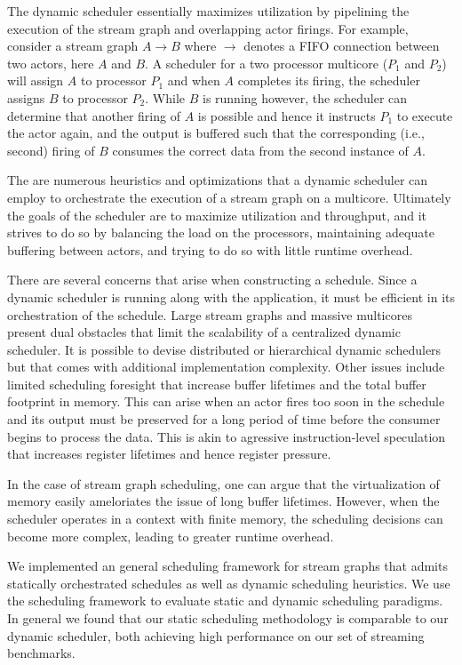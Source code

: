The dynamic scheduler essentially maximizes utilization by pipelining
the execution of the stream graph and overlapping actor firings. For
example, consider a stream graph $A\rightarrow B$ where $\rightarrow$
denotes a FIFO connection between two actors, here $A$ and $B$. A
scheduler for a two processor multicore ($P_1$ and $P_2$) will assign
$A$ to processor $P_1$ and when $A$ completes its firing, the
scheduler assigns $B$ to processor $P_2$. While $B$ is running
however, the scheduler can determine that another firing of $A$ is
possible and hence it instructs $P_1$ to execute the actor again, and
the output is buffered such that the corresponding (i.e., second)
firing of $B$ consumes the correct data from the second instance of
$A$.


The are numerous heuristics and optimizations that a dynamic scheduler
can employ to orchestrate the execution of a stream graph on a
multicore. Ultimately the goals of the scheduler are to maximize
utilization and throughput, and it strives to do so by balancing the
load on the processors, maintaining adequate buffering between actors,
and trying to do so with little runtime overhead.

There are several concerns that arise when constructing a
schedule. Since a dynamic scheduler is running along with the
application, it must be efficient in its orchestration of the
schedule. Large stream graphs and massive multicores present dual
obstacles that limit the scalability of a centralized dynamic
scheduler. It is possible to devise distributed or hierarchical
dynamic schedulers but that comes with additional implementation
complexity. Other issues include limited scheduling foresight that
increase buffer lifetimes and the total buffer footprint in
memory. This can arise when an actor fires too soon in the schedule
and its output must be preserved for a long period of time before the
consumer begins to process the data. This is akin to agressive
instruction-level speculation that increases register lifetimes and
hence register pressure.

In the case of stream graph scheduling, one can argue that the
virtualization of memory easily ameloriates the issue of long buffer
lifetimes. However, when the scheduler operates in a context with
finite memory, the scheduling decisions can become more complex,
leading to greater runtime overhead.

We implemented an general scheduling framework for stream graphs that
admits statically orchestrated schedules as well as dynamic scheduling
heuristics. We use the scheduling framework to evaluate static and
dynamic scheduling paradigms. In general we found that our static
scheduling methodology is comparable to our dynamic scheduler, both
achieving high performance on our set of streaming benchmarks.
